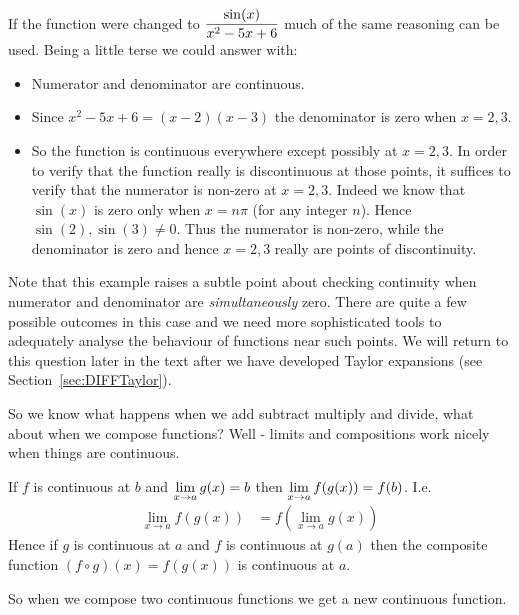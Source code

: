 \begin{eg}
If the function were changed to $\displaystyle \frac{\sin(x)}{x^2-5x+6}$ much of the same
reasoning can be used. Being a little terse we could answer with:
  \begin{itemize}
   \item Numerator and denominator are continuous.
   \item Since $x^2-5x+6=(x-2)(x-3)$ the denominator is zero when $x=2,3$.
   \item So the function is continuous everywhere except possibly
at $x=2,3$. In order to verify that the function really is discontinuous at
those points, it suffices to verify that the numerator is non-zero at $x=2,3$.
Indeed we know that $\sin(x)$ is zero only when $x = n\pi$ (for any integer
$n$). Hence $\sin(2),\sin(3) \neq 0$. Thus the numerator is non-zero, while the
denominator is zero and hence $x=2,3$ really are points of discontinuity.
\end{itemize}
Note that this example raises a subtle point about checking continuity when
numerator and denominator are \emph{simultaneously} zero. There are quite a
few possible outcomes in this case and we need more sophisticated tools to
adequately analyse the behaviour of functions near such points. We will return
to this question later in the text after we have developed Taylor expansions (see
Section~\ref{sec:DIFFTaylor}).
\end{eg}

So we know what happens when we add subtract multiply and divide, what about
when we compose functions? Well - limits and compositions work nicely when
things are continuous.
\begin{theorem}\label{thm comp cont}
  If $f$ is continuous at $b$ and $\displaystyle \lim_{x \to a} g(x) = b$ then
$\displaystyle \lim_{x\to a} f(g(x)) = f(b)$. I.e.
  \begin{align*}
   \lim_{x \to a} f\left( g(x) \right) &= f\left( \lim_{x \to a} g(x) \right)
  \end{align*}
Hence if $g$ is continuous at $a$ and $f$ is continuous at $g(a)$ then the
composite function $(f \circ g)(x) = f(g(x))$ is continuous at $a$.
\end{theorem}
So when we compose two continuous functions we get a new continuous function.

